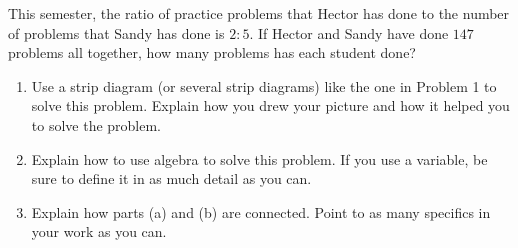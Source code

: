 \documentclass[nooutcomes,noauthor]{ximera}
\begin{document}
\begin{problem}
This semester, the ratio of practice problems that Hector has done to the number of problems that Sandy has done is $2:5$. If Hector and Sandy have done $147$ problems all together, how many problems has each student done?


\begin{enumerate}
	\item Use a strip diagram (or several strip diagrams) like the one in Problem 1 to solve this problem. Explain how you drew your picture and how it helped you to solve the problem.
	\item Explain how to use algebra to solve this problem. If you use a variable, be sure to define it in as much detail as you can.
	\item Explain how parts (a) and (b) are connected. Point to as many specifics in your work as you can.
\end{enumerate}
\end{problem}




\newpage
\end{document}
